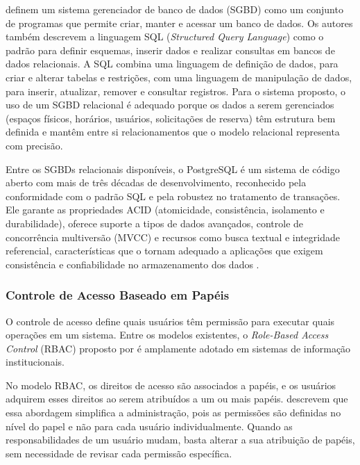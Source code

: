 \documentclass[
	12pt,				%
	twoside,			%
	openany,			%
	a4paper,			%
	chapter=TITLE,		%
	section=TITLE,		%
	subsection=TITLE,	%
	subsubsection=TITLE,%
	english,			%
	french,				%
	spanish,			%
	brazil,				%
	]{abntex2}
\begin{document}
 definem um sistema gerenciador de banco de dados (SGBD) como um conjunto de programas que permite criar, manter e acessar um banco de dados. Os autores também descrevem a linguagem SQL (\textit{Structured Query Language}) como o padrão para definir esquemas, inserir dados e realizar consultas em bancos de dados relacionais. A SQL combina uma linguagem de definição de dados, para criar e alterar tabelas e restrições, com uma linguagem de manipulação de dados, para inserir, atualizar, remover e consultar registros. Para o sistema proposto, o uso de um SGBD relacional é adequado porque os dados a serem gerenciados (espaços físicos, horários, usuários, solicitações de reserva) têm estrutura bem definida e mantêm entre si relacionamentos que o modelo relacional representa com precisão.

Entre os SGBDs relacionais disponíveis, o PostgreSQL é um sistema de código aberto com mais de três décadas de desenvolvimento, reconhecido pela conformidade com o padrão SQL e pela robustez no tratamento de transações. Ele garante as propriedades ACID (atomicidade, consistência, isolamento e durabilidade), oferece suporte a tipos de dados avançados, controle de concorrência multiversão (MVCC) e recursos como busca textual e integridade referencial, características que o tornam adequado a aplicações que exigem consistência e confiabilidade no armazenamento dos dados \cite{postgresql2024}.

\subsubsection{Controle de Acesso Baseado em Papéis}
\label{sec:rbac}

O controle de acesso define quais usuários têm permissão para executar quais operações em um sistema. Entre os modelos existentes, o \textit{Role-Based Access Control} (RBAC) proposto por  é amplamente adotado em sistemas de informação institucionais.

No modelo RBAC, os direitos de acesso são associados a papéis, e os usuários adquirem esses direitos ao serem atribuídos a um ou mais papéis.  descrevem que essa abordagem simplifica a administração, pois as permissões são definidas no nível do papel e não para cada usuário individualmente. Quando as responsabilidades de um usuário mudam, basta alterar a sua atribuição de papéis, sem necessidade de revisar cada permissão específica.
\end{document}
